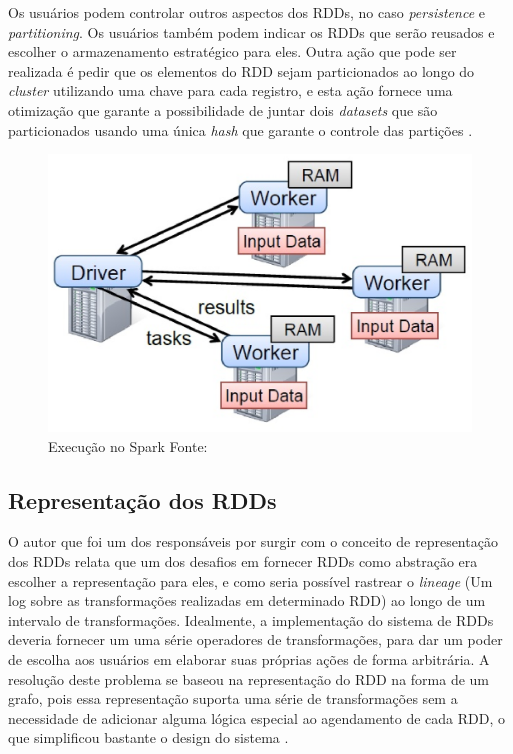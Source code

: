             Os usuários podem controlar outros aspectos dos RDDs, no caso \textit{persistence} e \textit{partitioning}. Os usuários
            também podem indicar os RDDs que serão reusados e escolher o armazenamento estratégico para eles. Outra ação que
            pode ser realizada é pedir que os elementos do RDD sejam particionados ao longo do \textit{cluster} utilizando uma
            chave para cada registro, e esta ação fornece uma otimização que garante a possibilidade de juntar dois \textit{datasets}
            que são particionados usando uma única \textit{hash} que garante o controle das partições \cite{zaharia2013}.

             \begin{figure}[ht!]
                        \centering
                        \includegraphics[keepaspectratio=true,scale=0.5]
                            {figuras/figura14.eps}
                        \caption[Execução no Spark]{Execução no Spark
                        \protect \linebreak Fonte: }
                        \label{figura14}
            \end{figure}

        \subsection{Representação dos RDDs}

            O autor  que foi um dos responsáveis por surgir com o conceito de representação dos RDDs
            relata que um dos desafios em fornecer RDDs como abstração era escolher a representação para eles, e como seria
            possível rastrear o \textit{lineage} (Um log sobre as transformações realizadas em determinado RDD) ao longo de
            um intervalo de transformações. Idealmente, a implementação do sistema de RDDs deveria fornecer um uma série
            operadores de transformações, para dar um poder de escolha aos usuários em elaborar suas próprias ações de forma
            arbitrária. A resolução deste problema se baseou na representação do RDD na forma de um grafo, pois essa representação
            suporta uma série de transformações sem a necessidade de adicionar alguma lógica especial ao agendamento de cada RDD,
            o que simplificou bastante o design do sistema \cite{zaharia2013}.

